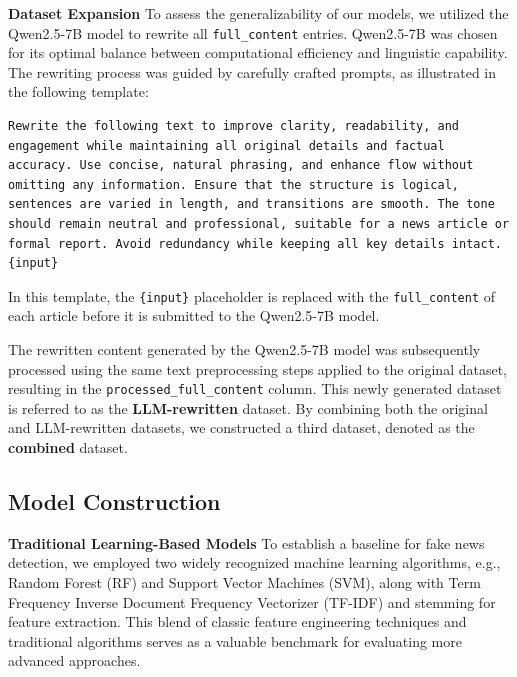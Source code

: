 \documentclass[runningheads]{llncs}
\begin{document}
\noindent \textbf{Dataset Expansion}
To assess the generalizability of our models, we utilized the Qwen2.5-7B model to rewrite all \texttt{full\_content} entries. Qwen2.5-7B was chosen for its optimal balance between computational efficiency and linguistic capability. The rewriting process was guided by carefully crafted prompts, as illustrated in the following template:
\begin{verbatim}
Rewrite the following text to improve clarity, readability, and engagement while maintaining all original details and factual accuracy. Use concise, natural phrasing, and enhance flow without omitting any information. Ensure that the structure is logical, sentences are varied in length, and transitions are smooth. The tone should remain neutral and professional, suitable for a news article or formal report. Avoid redundancy while keeping all key details intact.
{input}
\end{verbatim}

In this template, the \texttt{\{input\}} placeholder is replaced with the \texttt{full\_content} of each article before it is submitted to the Qwen2.5-7B model.

The rewritten content generated by the Qwen2.5-7B model was subsequently processed using the same text preprocessing steps applied to the original dataset, resulting in the \texttt{processed\_full\_content} column. This newly generated dataset is referred to as the \textbf{LLM-rewritten} dataset. By combining both the original and LLM-rewritten datasets, we constructed a third dataset, denoted as the \textbf{combined} dataset.


\subsection{Model Construction}

\noindent \textbf{Traditional Learning-Based Models}
% 
To establish a baseline for fake news detection, we employed two widely recognized machine learning algorithms, e.g., Random Forest (RF) and Support Vector Machines (SVM), along with Term Frequency Inverse Document Frequency Vectorizer (TF-IDF) and stemming for feature extraction. This blend of classic feature engineering techniques and traditional algorithms serves as a valuable benchmark for evaluating more advanced approaches.
\end{document}

